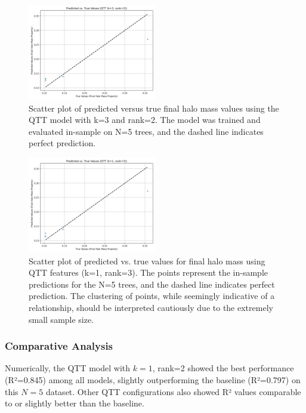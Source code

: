 \documentclass[twocolumn]{aastex631}
\begin{document}
\begin{figure}[h!]
    \centering
    \includegraphics[width=0.5\textwidth]{../input_files/plots/pred_vs_true_qtt_k3_r2_16_20250524-175150.png}
    \caption{Scatter plot of predicted versus true final halo mass values using the QTT model with k=3 and rank=2. The model was trained and evaluated in-sample on N=5 trees, and the dashed line indicates perfect prediction.
}
    \label{fig:pred_vs_true_qtt_k3_r2}
\end{figure}

\begin{figure}[h!]
    \centering
    \includegraphics[width=0.5\textwidth]{../input_files/plots/pred_vs_true_qtt_k1_r3_7_20250524-175150.png}
    \caption{Scatter plot of predicted vs. true values for final halo mass using QTT features (k=1, rank=3). The points represent the in-sample predictions for the N=5 trees, and the dashed line indicates perfect prediction. The clustering of points, while seemingly indicative of a relationship, should be interpreted cautiously due to the extremely small sample size.
}
    \label{fig:pred_vs_true_qtt_k1_r3}
\end{figure}

\subsubsection{Comparative Analysis}
Numerically, the QTT model with $k=1$, rank=2 showed the best performance (R²=0.845) among all models, slightly outperforming the baseline (R²=0.797) on this $N=5$ dataset. Other QTT configurations also showed R² values comparable to or slightly better than the baseline.
\end{document}
